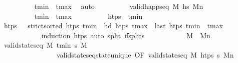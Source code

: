 \begin{isabellebody}
\ \ \ \ \ \ \ \ \isamarkupfalse%
\ {\isacartoucheopen}t\isactrlsub m\isactrlsub i\isactrlsub n\ {\isasymle}\ t\isactrlsub m\isactrlsub a\isactrlsub x{\isacartoucheclose}\ \isamarkupfalse%
\ auto\isanewline
\ \ \ \ \ \ \isamarkupfalse%
\ \isamarkupfalse%
\ {\isachardoublequoteopen}valid{\isacharunderscore}{\kern0pt}happ{\isacharunderscore}{\kern0pt}seq\ M\ hs\ M\isactrlsub n{\isachardoublequoteclose}\isanewline
\ \ \ \ \ \ \isamarkupfalse%
\isanewline
\ \ \ \ \ \ \ \ \isamarkupfalse%
\ {\isachardoublequoteopen}t\isactrlsub m\isactrlsub i\isactrlsub n\ {\isacharequal}{\kern0pt}\ t\isactrlsub m\isactrlsub a\isactrlsub x{\isachardoublequoteclose}\isanewline
\ \ \ \ \ \ \ \ \isamarkupfalse%
\ {\isachardoublequoteopen}htps\ {\isacharequal}{\kern0pt}\ {\isacharbrackleft}{\kern0pt}t\isactrlsub m\isactrlsub i\isactrlsub n{\isacharbrackright}{\kern0pt}{\isachardoublequoteclose}\isanewline
\ \ \ \ \ \ \ \ \ \ \isamarkupfalse%
\ {\isacartoucheopen}htps\ {\isasymnoteq}\ {\isacharbrackleft}{\kern0pt}{\isacharbrackright}{\kern0pt}{\isacartoucheclose}\ {\isacartoucheopen}strict{\isacharunderscore}{\kern0pt}sorted\ htps{\isacartoucheclose}\ {\isacartoucheopen}t\isactrlsub m\isactrlsub i\isactrlsub n\ {\isacharequal}{\kern0pt}\ hd\ htps{\isacartoucheclose}\ {\isacartoucheopen}t\isactrlsub m\isactrlsub a\isactrlsub x\ {\isacharequal}{\kern0pt}\ last\ htps{\isacartoucheclose}\ {\isacartoucheopen}t\isactrlsub m\isactrlsub i\isactrlsub n\ {\isacharequal}{\kern0pt}\ t\isactrlsub m\isactrlsub a\isactrlsub x{\isacartoucheclose}\isanewline
\ \ \ \ \ \ \ \ \ \ \isamarkupfalse%
\ {\isacharparenleft}{\kern0pt}induction\ htps{\isacharparenright}{\kern0pt}\ {\isacharparenleft}{\kern0pt}auto\ split{\isacharcolon}{\kern0pt}\ if{\isacharunderscore}{\kern0pt}splits{\isacharparenright}{\kern0pt}\isanewline
\ \ \ \ \ \ \ \ \isamarkupfalse%
\ \isamarkupfalse%
\ {\isachardoublequoteopen}M\ {\isacharequal}{\kern0pt}\ M\isactrlsub n{\isachardoublequoteclose}\isanewline
\ \ \ \ \ \ \ \ \ \ \isamarkupfalse%
\ {\isacartoucheopen}valid{\isacharunderscore}{\kern0pt}state{\isacharunderscore}{\kern0pt}seq\ M\ {\isacharbrackleft}{\kern0pt}t\isactrlsub m\isactrlsub i\isactrlsub n{\isacharbrackright}{\kern0pt}\ {\isasympi}s\ M\ \isanewline
\ \ \ \ \ \ \ \ \ \ \ \ \ \ \ \ valid{\isacharunderscore}{\kern0pt}state{\isacharunderscore}{\kern0pt}seq{\isacharunderscore}{\kern0pt}state{\isacharunderscore}{\kern0pt}unique\ {\isacharbrackleft}{\kern0pt}OF\ {\isacartoucheopen}valid{\isacharunderscore}{\kern0pt}state{\isacharunderscore}{\kern0pt}seq\ M\ htps\ {\isasympi}s\ M\isactrlsub n{\isacartoucheclose}{\isacharbrackright}{\kern0pt}\isanewline

\end{isabellebody}
